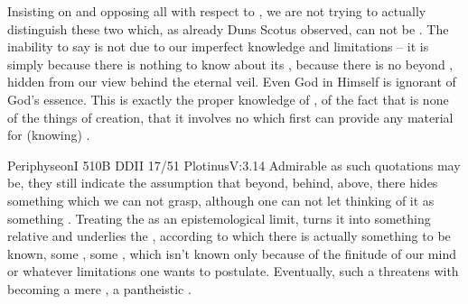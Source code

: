 Insisting on  and opposing all  with respect to , we
are not trying to actually distinguish these two  which, as already Duns
Scotus observed, can not be .
The inability to say  is not due to our imperfect
knowledge and limitations -- it is simply because there is nothing to know about
its , because there is no  beyond , 
hidden from our view behind the eternal veil.
Even God in Himself is ignorant of God's essence.
This  is exactly the proper knowledge of , of the fact
that  is none of the things of creation, that it involves no
 which first can provide any material for (knowing) 
.

\citet{He surpasses every intellect and all sensible and intelligible meanings
  Who is better known by not knowing, of Whom ignorance is the true
  knowledge.}{Periphyseon}{I 510B} \citet{But sacred ignorance teaches me that
  what seems nothing to the intellect is the incomprehensible maximum.}{DDI}{I
  17/51} 
\citet{We do not, it is true, grasp it by knowledge, but that does not mean that
we are utterly void of it; we hold it not so as to state it, but so as to be
able to speak about it. And we can and do state what it is not, while we are
silent as to what it is [...]}{Plotinus}{V:3.14}
Admirable as such quotations may be, they still indicate the
assumption that beyond, behind, above, there hides something which we can not
grasp, although one can not let thinking of it as something .
Treating the  as an epistemological limit, turns it into something
  relative and underlies the 
, according to which there is actually something to
be known, some , some , which isn't
known only because of the finitude of our mind or whatever limitations one wants
to postulate. Eventually, such a  threatens with becoming a mere
  , a pantheistic .

